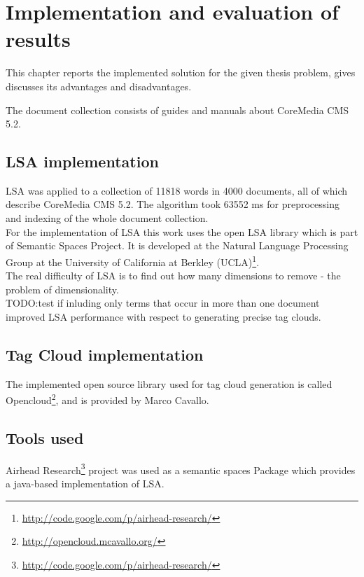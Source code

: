 \chapter{Implementation and evaluation of results}
\label{sec:implementation}

\begin{summary}
This chapter reports the implemented solution for the given thesis problem, gives discusses its advantages and disadvantages.
\end{summary}


The document collection consists of guides and manuals about CoreMedia \gls{CMS} 5.2.\\

\section{LSA implementation}
\label{sec:implementation:lsa_impl}
\gls{LSA} was applied to a collection of 11818 words in 4000 documents, all of which describe CoreMedia \gls{CMS} 5.2. The algorithm took  63552 ms for preprocessing and indexing of the whole document collection. \\

For the implementation of LSA this work uses the open LSA library which is part of Semantic Spaces Project\cite{S-Space}. It is developed at the Natural Language Processing Group at the University of California at Berkley (UCLA)\footnote{\url{http://code.google.com/p/airhead-research/}}.\\

The real difficulty of LSA is to find out how many dimensions to remove - the problem of dimensionality.\\

TODO:test if inluding only terms that occur in more than one document improved \gls{LSA} performance with respect to generating precise tag clouds.\\

\section{Tag Cloud implementation}
\label{sec:implementation:tag_cloud}
The implemented open source library used for tag cloud generation is called Opencloud\footnote{\url{http://opencloud.mcavallo.org/}}, and is provided by Marco Cavallo.\\

\section{Tools used}
\label{sec:implementation:tools_used}
Airhead Research\footnote{\url{http://code.google.com/p/airhead-research/}} project was used as a semantic spaces Package which provides a java-based implementation of \gls{LSA}.\\

